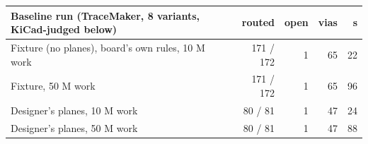 \begin{tabular}{lrrrr}
\toprule
Baseline run (TraceMaker, 8 variants, KiCad-judged below) & routed & open & vias & s \\
\midrule
Fixture (no planes), board's own rules, 10 M work & 171 / 172 & 1 & 65 & 22 \\
Fixture, 50 M work & 171 / 172 & 1 & 65 & 96 \\
Designer's planes, 10 M work & 80 / 81 & 1 & 47 & 24 \\
Designer's planes, 50 M work & 80 / 81 & 1 & 47 & 88 \\
\bottomrule
\end{tabular}
